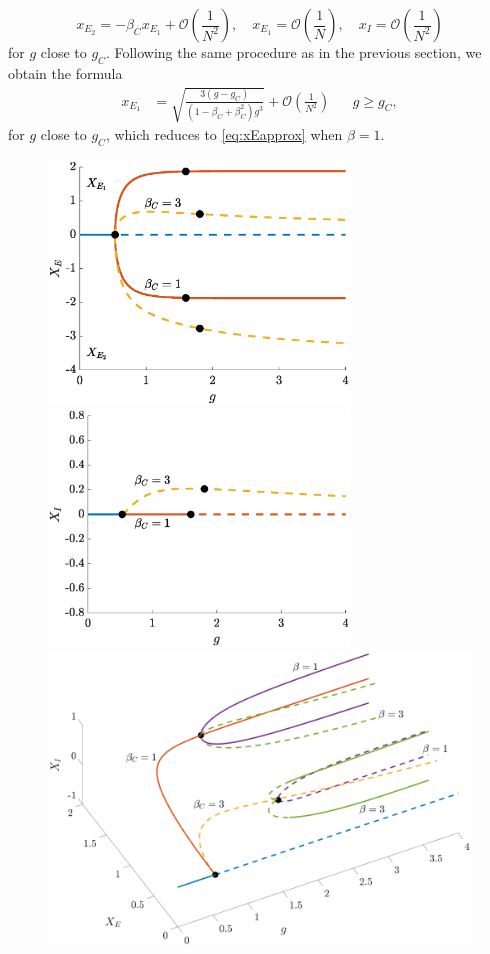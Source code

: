 \documentclass[reqno]{siamonline190516}
\begin{document}
\begin{equation}\label{eq:XE1E2asymp}
    x_{E_2} = -\beta_C x_{E_1} + \mathcal{O}\left( \frac{1}{N^2} \right), \quad 
    x_{E_1} = \mathcal{O}\left( \frac{1}{N} \right), \quad
    x_I = \mathcal{O}\left( \frac{1}{N^2} \right)
\end{equation}
for $g$ close to $g_C$. Following the same procedure as in the previous section, we obtain the formula
 \begin{align}\label{eq:XE1}
 x_{E_1} &= \sqrt{ \frac{ 3(g - g_C) }{ (1 - \beta_C + \beta_C^2 )g^3}} + \mathcal{O}\left( \frac{1}{N^2}\right)&& g \geq g_C,
\end{align}
for $g$ close to $g_C$, which reduces to \cref{eq:xEapprox} when $\beta = 1$.

\begin{figure}
    \centering
    \includegraphics[width=8cm]{images/bdclusters20c4E.eps} 
    \includegraphics[width=8cm]{images/bdclusters20c4I.eps} 
    \vspace{-0.5cm}
    \includegraphics[width=16cm]{images/bdclusters20c43D.eps} 

\end{figure}
\end{document}
